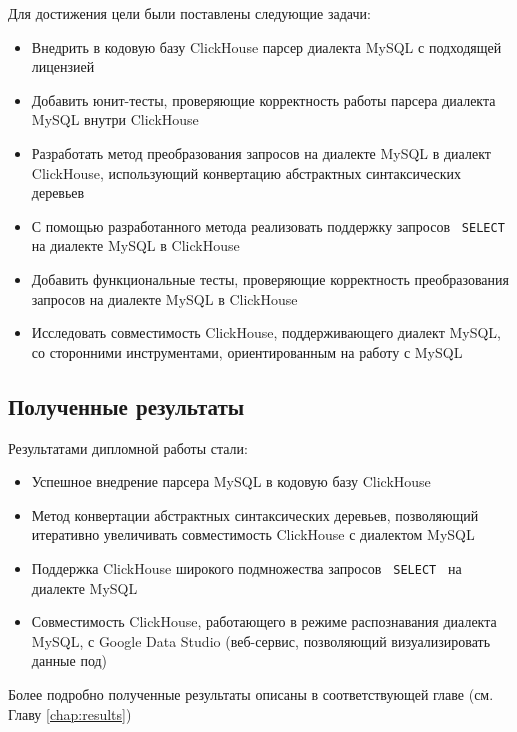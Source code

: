 Для достижения цели были поставлены следующие задачи:
\begin{itemize}
  \item Внедрить в кодовую базу ClickHouse парсер диалекта MySQL с подходящей лицензией
  \item Добавить юнит-тесты, проверяющие корректность работы парсера диалекта MySQL внутри ClickHouse
  \item Разработать метод преобразования запросов на диалекте MySQL в диалект ClickHouse, использующий конвертацию абстрактных синтаксических деревьев
  \item С помощью разработанного метода реализовать поддержку запросов \texttt{ SELECT } на диалекте MySQL в ClickHouse
  \item Добавить функциональные тесты, проверяющие корректность преобразования запросов на диалекте MySQL в ClickHouse
  \item Исследовать совместимость ClickHouse, поддерживающего диалект MySQL, со сторонними инструментами, ориентированным на работу с MySQL
\end{itemize}

\subsection{Полученные результаты}
Результатами дипломной работы стали:

\begin{itemize}
    \item Успешное внедрение парсера MySQL в кодовую базу ClickHouse
    \item Метод конвертации абстрактных синтаксических деревьев, позволяющий итеративно увеличивать совместимость ClickHouse с диалектом MySQL
    \item Поддержка ClickHouse широкого подмножества запросов \texttt{ SELECT } на диалекте MySQL
    \item Совместимость ClickHouse, работающего в режиме распознавания диалекта MySQL, с Google Data Studio (веб-сервис, позволяющий визуализировать данные под)
\end{itemize}

Более подробно полученные результаты описаны в соответствующей главе (см. Главу \ref{chap:results})

